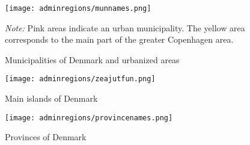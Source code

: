 \begin{figure}[!htb]
\centering
\begin{minipage}{0.8\textwidth}
\texttt{[image: adminregions/munnames.png]} 
{\tiny \emph{Note:} Pink areas indicate an urban municipality. The yellow area corresponds to the main part of the greater Copenhagen area.\\ \par}
\end{minipage}
\caption{Municipalities of Denmark and urbanized areas}
\label{apfig:mun}
\end{figure}

\begin{figure}[!htb]
\centering
\begin{minipage}{0.8\textwidth}
\texttt{[image: adminregions/zeajutfun.png]} 
\end{minipage}
\caption{Main islands of Denmark}
\label{apfig:islands}
\end{figure}


\begin{figure}[!htb]
\centering
\begin{minipage}{0.8\textwidth}
\texttt{[image: adminregions/provincenames.png]} 
\end{minipage}
\caption{Provinces of Denmark}
\label{apfig:prov}
\end{figure}

